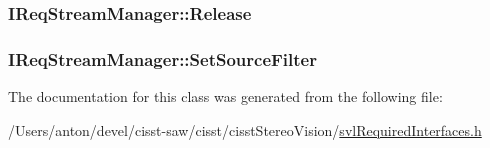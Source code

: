 \subsubsection[{Release}]{ I\+Req\+Stream\+Manager\+::\+Release}\label{class_i_req_stream_manager_a2f12fc26563af9bb3e035f7758cee301}
\hypertarget{class_i_req_stream_manager_a1574c68fc18c8006f65360a0f7022e53}{}
\subsubsection[{Set\+Source\+Filter}]{ I\+Req\+Stream\+Manager\+::\+Set\+Source\+Filter}\label{class_i_req_stream_manager_a1574c68fc18c8006f65360a0f7022e53}


The documentation for this class was generated from the following file\+:\begin{DoxyCompactItemize}
\item 
/\+Users/anton/devel/cisst-\/saw/cisst/cisst\+Stereo\+Vision/\hyperlink{svl_required_interfaces_8h}{svl\+Required\+Interfaces.\+h}\end{DoxyCompactItemize}
